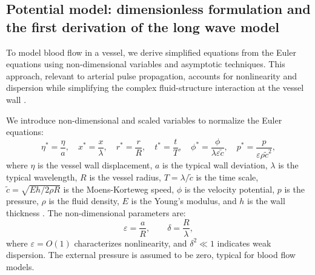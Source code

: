 \documentclass[alpha-refs, 12pt]{wiley-article}
\newcommand{\eps}{\varepsilon}
\begin{document}
\subsection{Potential model: dimensionless formulation and the first derivation of the long wave model}\label{sec:dimless_longwave}

To model blood flow in a vessel, we derive simplified equations from the Euler equations using non-dimensional variables and asymptotic techniques. This approach, relevant to arterial pulse propagation, accounts for nonlinearity and dispersion while simplifying the complex fluid-structure interaction at the vessel wall \citep{Fung1993}.

We introduce non-dimensional and scaled variables to normalize the Euler equations:
\begin{equation}\label{eq:ndv}
  \eta^* = \frac{\eta}{a}, \quad x^* = \frac{x}{\lambda}, \quad r^* = \frac{r}{R}, \quad t^* = \frac{t}{T}, \quad \phi^* = \frac{\phi}{\lambda \eps \tilde{c}}, \quad p^* = \frac{p}{\eps \rho \tilde{c}^2},
\end{equation}
where $\eta$ is the vessel wall displacement, $a$ is the typical wall deviation, $\lambda$ is the typical wavelength, $R$ is the vessel radius, $T = \lambda / \tilde{c}$ is the time scale, $\tilde{c} = \sqrt{E h / 2 \rho R}$ is the Moens-Korteweg speed, $\phi$ is the velocity potential, $p$ is the pressure, $\rho$ is the fluid density, $E$ is the Young's modulus, and $h$ is the wall thickness \citep{Fung1993}. The non-dimensional parameters are:
\begin{equation}\label{eq:parameters}
  \eps = \frac{a}{R}, \qquad \delta = \frac{R}{\lambda},
\end{equation}
where $\eps = O(1)$ characterizes nonlinearity, and $\delta^2 \ll 1$ indicates weak dispersion. The external pressure is assumed to be zero, typical for blood flow models.
\end{document}
